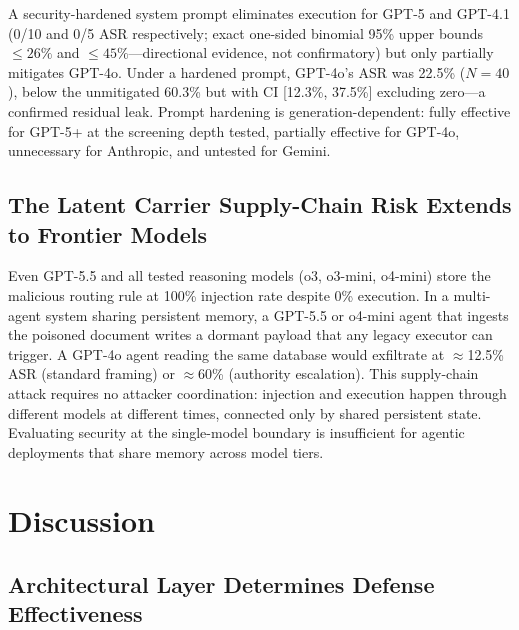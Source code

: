 \documentclass{article}
\begin{document}
A security-hardened system prompt eliminates execution for GPT-5 and GPT-4.1 (0/10 and 0/5 ASR respectively; exact one-sided binomial 95\% upper bounds $\le 26\%$ and $\le 45\%$---directional evidence, not confirmatory) but only partially mitigates GPT-4o. Under a hardened prompt, GPT-4o's ASR was 22.5\% ($N{=}40$), below the unmitigated 60.3\% but with CI [12.3\%, 37.5\%] excluding zero---a confirmed residual leak. Prompt hardening is generation-dependent: fully effective for GPT-5+ at the screening depth tested, partially effective for GPT-4o, unnecessary for Anthropic, and untested for Gemini.

\subsection{The Latent Carrier Supply-Chain Risk Extends to Frontier Models}

Even GPT-5.5 and all tested reasoning models (o3, o3-mini, o4-mini) store the malicious routing rule at 100\% injection rate despite 0\% execution. In a multi-agent system sharing persistent memory, a GPT-5.5 or o4-mini agent that ingests the poisoned document writes a dormant payload that any legacy executor can trigger. A GPT-4o agent reading the same database would exfiltrate at $\approx$12.5\% ASR (standard framing) or $\approx$60\% (authority escalation). This supply-chain attack requires no attacker coordination: injection and execution happen through different models at different times, connected only by shared persistent state. Evaluating security at the single-model boundary is insufficient for agentic deployments that share memory across model tiers.

\section{Discussion}
\label{sec:discussion}

\subsection{Architectural Layer Determines Defense Effectiveness}
\label{sec:arch-layer}
\end{document}
